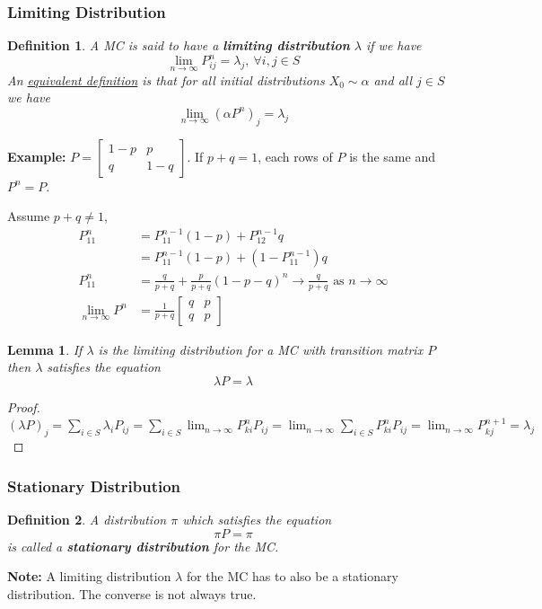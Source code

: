 \documentclass[11pt,a4paper]{article}
\newtheorem{definition}{Definition}
\newtheorem{lemma}{Lemma}
\begin{document}
\subsubsection{Limiting Distribution}
\begin{definition}
    A MC is said to have a \textbf{limiting distribution} $\lambda$ if we have $$\lim_{n \rightarrow \infty}P_{ij}^n=\lambda_j,\ \forall i,j\in S$$
    An \underline{equivalent definition} is that for all initial distributions $X_0\sim \alpha$ and all $j\in S$ we have
    $$\lim_{n \rightarrow \infty}(\alpha P^n)_j=\lambda_j$$
\end{definition}

\textbf{Example: }$P=\begin{bmatrix}
    1-p&p\\
    q&1-q
\end{bmatrix}$. If $p+q=1$, each rows of $P$ is the same and $P^n=P$.

Assume $p+q\neq 1$,
\begin{equation}
    \begin{aligned}
        P^n_{11}&=P^{n-1}_{11}(1-p)+P^{n-1}_{12}q\\&=P^{n-1}_{11}(1-p)+(1-P^{n-1}_{11})q\\
        P^n_{11}&=\frac{q}{p+q}+\frac{p}{p+q}(1-p-q)^n \rightarrow \frac{q}{p+q}\text{ as }n \rightarrow \infty\\
        \lim_{n \rightarrow \infty}P^n&=\frac{1}{p+q}\begin{bmatrix}
            q&p\\
            q&p
        \end{bmatrix}
    \end{aligned}
    \nonumber
\end{equation}

\begin{lemma}
    If $\lambda$ is the limiting distribution for a MC with transition matrix $P$ then $\lambda$ satisfies the equation $$\lambda P=\lambda$$
\end{lemma}
\begin{proof}
    $(\lambda P)_j=\sum_{i\in S}\lambda_i P_{ij}=\sum_{i\in S}\lim_{n \rightarrow \infty}P_{ki}^nP_{ij}=\lim_{n \rightarrow \infty}\sum_{i\in S}P_{ki}^nP_{ij}=\lim_{n \rightarrow \infty}P_{kj}^{n+1}=\lambda_j$
\end{proof}

\subsubsection{Stationary Distribution}
\begin{definition}
    A distribution $\pi$ which satisfies the equation $$\pi P=\pi$$ is called a \textbf{stationary distribution} for the MC.
\end{definition}
\textbf{Note: }A limiting distribution $\lambda$ for the MC has to also be a stationary distribution. The converse is not always true.
\end{document}
